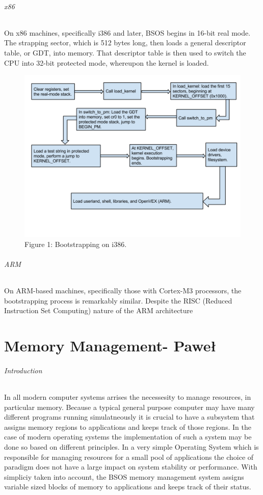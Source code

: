 \documentclass[english]{article}
\begin{document}
\paragraph{x86}
On x86 machines, specifically i386 and later, BSOS begins in 16-bit real mode. The strapping sector, which is 512 bytes long, then loads a general descriptor table, or GDT, into memory. That descriptor table is then used to switch the CPU into 32-bit protected mode, whereupon the kernel is loaded.
\begin{figure}[h!]
\centerline{\includegraphics[scale=0.4]{imgs/boot_x86.png}}
\caption{Figure 1: Bootstrapping on i386.}
\end{figure}

\paragraph{ARM}
On ARM-based machines, specifically those with Cortex-M3 processors, the bootstrapping process is remarkably similar. Despite the RISC (Reduced Instruction Set Computing) nature of the ARM architecture


\part{Memory Management- Pawe\l{}}

\paragraph{Introduction}
In all modern computer systems arrises the necessesity to manage resources, in particular memory. Because a typical general purpose computer
may have many different programs running simulatneously it is crucial to have a subsystem that assigns memory regions to applications and keeps
track of those regions. In the case of modern operating systems the implementation of such a system may be done so based on different principles.
In a very simple Operating System which is responsible for managing resources for a small pool of applications the choice of paradigm does not have a large impact on system stability or performance.
With simpliciy taken into account, the BSOS memory management system assigns variable sized blocks of memory to applications and keeps track of their status.
\end{document}
